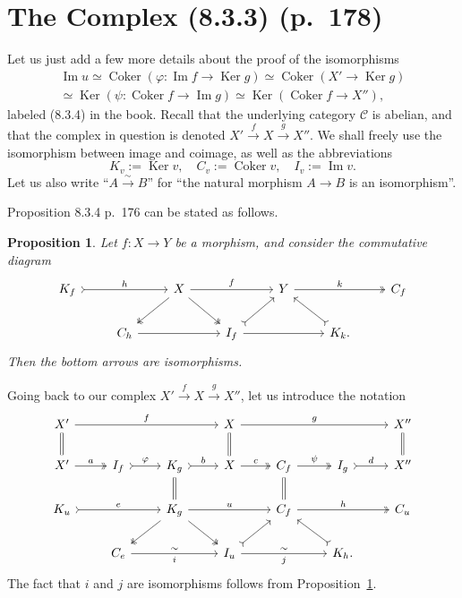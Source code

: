 \documentclass[12pt]{article}
\newtheorem{prop}[thm]{Proposition}
\theoremstyle{remark}
\theoremstyle{definition}
\newcommand{\C}{\mathcal C}
\DeclareMathOperator{\Coker}{Coker}
\DeclareMathOperator{\Ima}{Im}
\DeclareMathOperator{\Ker}{Ker}
\begin{document}
\section{The Complex (8.3.3) (p.~178)} %
%
Let us just add a few more details about the proof of the isomorphisms
\begin{equation}\label{834}
\begin{split}
\Ima u\simeq\Coker(\varphi:\Ima f\to\Ker g)\simeq\Coker(X'\to\Ker g)\\ 
\simeq\Ker(\psi:\Coker f\to\Ima g)\simeq\Ker(\Coker f\to X''),
\end{split}
\end{equation}
labeled (8.3.4) in the book. Recall that the underlying category $\C$ is abelian, and that the complex in question is denoted $X'\xrightarrow{f}X\xrightarrow{g}X''$. We shall freely use the isomorphism between image and coimage, as well as the abbreviations 
$$
K_v:=\Ker v,\quad C_v:=\Coker v,\quad I_v:=\Ima v.
$$ 
Let us also write ``$A\overset{\sim}{\to}B$'' for ``the natural morphism $A\to B$ is an isomorphism''. 

Proposition 8.3.4 p.~176 can be stated as follows. 
%
\begin{prop}\label{p834}
Let $f:X\to Y$ be a morphism, and consider the commutative diagram 
$$
\begin{tikzcd}
K_f\ar[tail]{rr}{h}&&X\ar{rr}{f}\ar[two heads]{dl}\ar[two heads]{dr}&&Y\ar[two heads]{rr}{k}&&C_f\\ 
&C_h\ar{rr}&&I_f\ar[tail]{ur}\ar{rr}&&K_k.\ar[tail]{ul}
\end{tikzcd}
$$ 
Then the bottom arrows are isomorphisms.
\end{prop}
%
Going back to our complex $X'\overset{f}{\to}X\overset{g}{\to}X''$, let us introduce the notation 
$$
\begin{tikzcd}
X'\ar{rrr}{f}\ar[equal]{d}&&&X\ar[equal]{d}\ar{rrr}{g}&&&X''\ar[equal]{d}\\ 
X'\ar[two heads]{r}{a}&I_f\ar[tail]{r}{\varphi}&K_g\ar[equal]{d}\ar[tail]{r}{b}&X\ar[two heads]{r}{c}&C_f\ar[equal]{d}\ar[two heads]{r}{\psi}&I_g\ar[tail]{r}{d}&X''\\ 
K_u\ar[tail]{rr}{e}&&K_g\ar[two heads]{dl}\ar[two heads]{dr}\ar{rr}{u}&&C_f\ar[two heads]{rr}{h}&&C_u\\ 
&C_e\ar{rr}{\sim}[swap]{i}&&I_u\ar[tail]{ur}\ar{rr}{\sim}[swap]{j}&&K_h.\ar[tail]{ul}
\end{tikzcd}
$$ 
The fact that $i$ and $j$ are isomorphisms follows from Proposition~\ref{p834}. 
\end{document}
